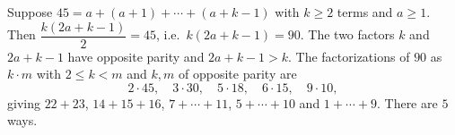 Suppose $45=a+(a+1)+\cdots+(a+k-1)$ with $k\ge2$ terms and $a\ge1$. Then $\dfrac{k(2a+k-1)}{2}=45$, i.e.\ $k(2a+k-1)=90$. The two factors $k$ and $2a+k-1$ have opposite parity and $2a+k-1>k$. The factorizations of $90$ as $k\cdot m$ with $2\le k<m$ and $k,m$ of opposite parity are
\[
2\cdot45,\quad3\cdot30,\quad5\cdot18,\quad6\cdot15,\quad9\cdot10,
\]
giving $22+23$, $14+15+16$, $7+\cdots+11$, $5+\cdots+10$ and $1+\cdots+9$. There are $\boxed{5}$ ways.
